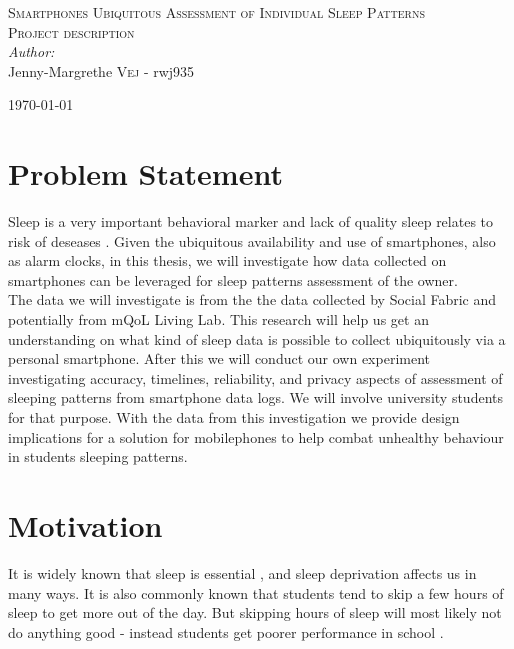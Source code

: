 \documentclass[12pt]{article}
\begin{document}

\begin{center}
\textsc{\Large Smartphones Ubiquitous Assessment of Individual Sleep Patterns}\\[0.5cm] 
\textsc{\large Project description}\\[0.5cm] 


\emph{Author:}
\\
Jenny-Margrethe \textsc{Vej} - rwj935\\ 
\vspace{10mm}

{\large \today}\\[3cm] 
\end{center}
\vspace{-20mm}

\section{Problem Statement}
Sleep is a very important behavioral marker and lack of quality sleep relates to risk of deseases
 \cite{Gumbiner2012}. Given the ubiquitous availability and use of smartphones, also as alarm 
 clocks, in this thesis, we will investigate how data collected on smartphones 
 can be leveraged for sleep patterns assessment of the owner. \\

The data we will investigate is from the the data collected by Social Fabric\cite{Stopczynski2014} and potentially from mQoL Living Lab\cite{mQOL}. This research will help us get an understanding on what kind of sleep data is possible to collect ubiquitously via a personal smartphone. After this we will conduct our own experiment investigating accuracy, timelines, reliability, and privacy aspects of assessment of sleeping patterns from smartphone data logs. We will involve university students for that purpose. With the data from this investigation we provide design implications for a solution for mobilephones to help combat unhealthy behaviour in students sleeping patterns.

\section{Motivation}
It is widely known that sleep is essential \cite{Gumbiner2012}, and sleep deprivation affects 
us in many ways. It is also commonly known that students tend to skip a few hours of sleep to 
get more out of the day. But skipping hours of sleep will most likely not do anything good - instead
students get poorer performance in school \cite{Gilbert2010}. \\
\end{document}
